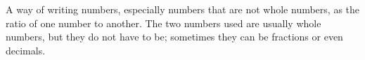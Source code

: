 A way of writing numbers, especially numbers that
are not whole numbers, as the ratio of one number to 
another. The two numbers used are usually whole numbers,
but they do not have to be; sometimes they can be fractions
or even decimals.